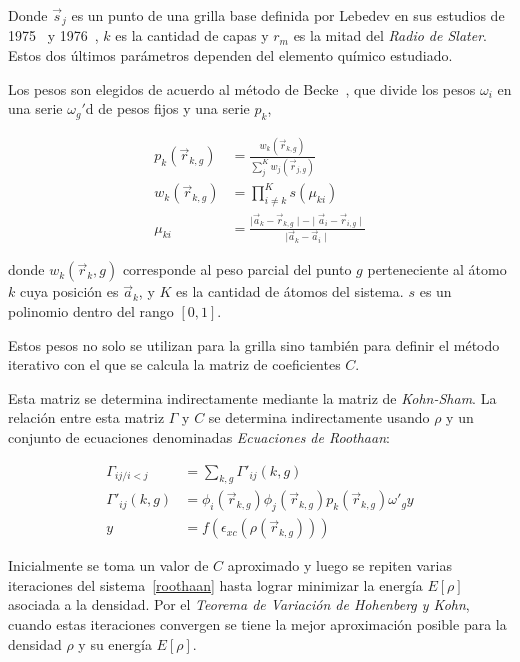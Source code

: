 Donde $\vec{s}_j$ es un punto de una grilla base definida por Lebedev en sus estudios de 1975~\cite{Lebedev1} y 1976~\cite{Lebedev2},
$k$ es la cantidad de capas y $r_m$ es la mitad del \textit{Radio de Slater}. Estos dos \'ultimos par\'ametros dependen del elemento qu\'imico
estudiado.

Los pesos son elegidos de acuerdo al m\'etodo de Becke~\cite{Becke}, que divide los
pesos $\omega_i$ en una serie $\omega_g'$d de pesos fijos y una serie $p_k$,

\begin{align}
    p_k(\vec{r}_{k,g}) & = \frac{w_k(\vec{r}_{k,g})}{\sum_j^K w_j(\vec{r}_{j,g})} \\
    w_k(\vec{r}_{k,g}) & = \prod_{i \neq k}^K s(\mu_{ki}) \\
    \mu_{ki} & = \frac{\mid \vec{a}_k - \vec{r}_{k,g} \mid - \mid \vec{a}_i - \vec{r}_{i,g} \mid }{ \mid \vec{a}_k - \vec{a}_i \mid }
\end{align}

donde $w_k(\vec{r}_k,g)$ corresponde al peso parcial del punto $g$ perteneciente al
\'atomo $k$ cuya posici\'on es $\vec{a}_k$, y $K$ es la cantidad de \'atomos del
sistema. $s$ es un polinomio dentro del rango $[0,1]$.

Estos pesos no solo se utilizan para la grilla sino tambi\'en para definir el m\'etodo
iterativo con el que se calcula la matriz de coeficientes $C$.

Esta matriz se determina indirectamente mediante la matriz de \textit{Kohn-Sham}. La
relaci\'on entre esta matriz $\Gamma$ y $C$ se determina indirectamente usando $\rho$
y un conjunto de ecuaciones denominadas \textit{Ecuaciones de Roothaan}:

\begin{align}
    \label{roothaan}
    \Gamma_{ij/ i < j} & = \sum_{k,g} \Gamma'_{ij}(k,g) \\
    \Gamma'_{ij} (k,g) & = \phi_i (\vec{r}_{k,g}) \phi_j (\vec{r}_{k,g}) p_k(\vec{r}_{k,g}) \omega'_g y \\
    y & = f(\epsilon_{xc}(\rho(\vec{r}_{k,g}))) 
\end{align}

Inicialmente se toma un valor de $C$ aproximado y luego se repiten varias iteraciones
del sistema~\ref{roothaan} hasta lograr minimizar la energ\'ia $E[\rho]$ asociada
a la densidad. Por el \textit{Teorema de Variaci\'on de Hohenberg y Kohn}, cuando
estas iteraciones convergen se tiene la mejor aproximaci\'on posible para la
densidad $\rho$ y su energ\'ia $E[\rho]$.

